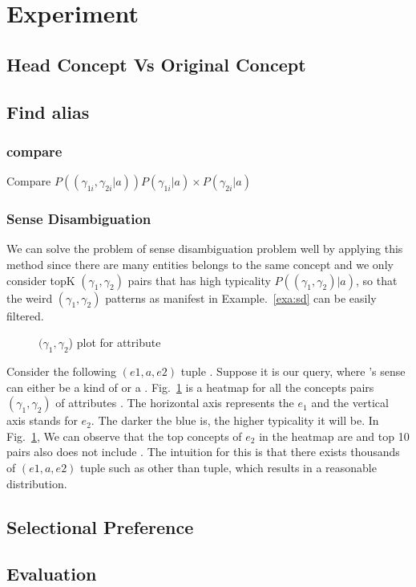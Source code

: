 \section{Experiment}

\subsection{Head Concept Vs Original Concept}

\subsection{Find alias}
\subsubsection{compare}

Compare $ P((\gamma_{1i},\gamma_{2i} |a ))P(\gamma_{1i}|a) \times P(\gamma_{2i}|a)$




\subsubsection{Sense Disambiguation}

We can solve the problem of sense disambiguation problem well by applying this method since there are many entities belongs to the same concept and we only consider topK $(\gamma_1,\gamma_2)$ pairs that has high typicality $P( (\gamma_1,\gamma_2) |a)$, so that the weird $(\gamma_1,\gamma_2)$ patterns as manifest in Example.~\ref{exa:sd} can be easily filtered. 


\begin{figure}[!htb]
\centering {}
\caption{$(\gamma_1,\gamma_2$) plot for attribute } \label{fig:evplot}
\end{figure}

\begin{example}
Consider the following $(e1,a,e2)$ tuple . Suppose it is our query, where 's sense can either be a kind of  or a .
Fig.~\ref{fig:evplot} is a heatmap for all the concepts pairs $(\gamma_1,\gamma_2)$ of attributes . The horizontal axis represents the $e_1$ and the vertical axis stands for $e_2$. The darker the blue is, the higher typicality it will be. In Fig.~\ref{fig:evplot}, We can observe that the top concepts of $e_2$ in the heatmap are  and top 10 pairs also does not include . The intuition for this is that there exists thousands of $(e1,a,e2)$ tuple such as  other than  tuple, which results in a reasonable distribution.
\label{exa:sd}
\end{example}


\subsection{Selectional Preference}

\subsection{Evaluation}
